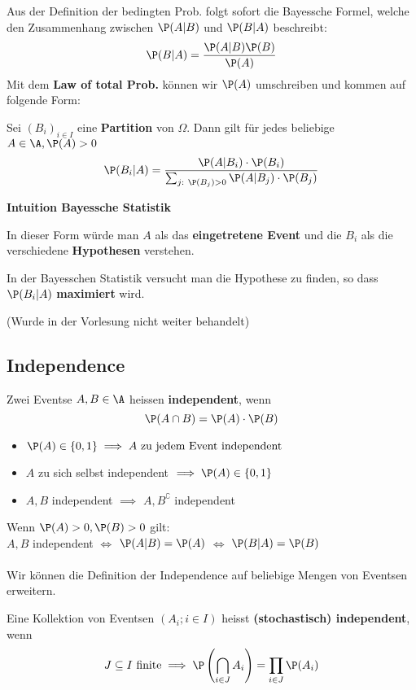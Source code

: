 Aus der Definition der bedingten Prob. folgt sofort die Bayessche Formel, welche den Zusammenhang zwischen $\P(A|B)$ und $\P(B|A)$ beschreibt:
$$\P(B|A) = \frac{\P(A|B)\P(B)}{\P(A)}$$
Mit dem \textbf{Law of total Prob.} können wir $\P(A)$ umschreiben und kommen auf folgende Form:

Sei $(B_i)_{i\in I}$ eine \textbf{Partition} von $\Omega$. Dann gilt für jedes beliebige $A \in \A, \P(A) > 0$
$$\P(B_i|A) = \frac{\P(A|B_i)\cdot\P(B_i)}{\sum_{j:\ \P(B_j)>0}\P(A|B_j)\cdot \P(B_j)}$$

\textbf{Intuition Bayessche Statistik}

In dieser Form würde man $A$ als das \textbf{eingetretene Event} und die $B_i$ als die verschiedene \textbf{Hypothesen} verstehen. 

In der Bayesschen Statistik versucht man die Hypothese zu finden, so dass $\P(B_i|A)$ \textbf{maximiert} wird.

(Wurde in der Vorlesung nicht weiter behandelt)
\subsection{Independence} 
\begin{mainbox}{}
    Zwei Eventse $A, B \in \A$ heissen \textbf{independent}, wenn 
    $$\P(A\cap B) = \P(A) \cdot \P(B)$$
\end{mainbox}
\begin{itemize}
    \item $\P(A) \in \{0, 1\} \implies A \text{ zu jedem Event independent}$
    \item $A$ zu sich selbst independent $\implies \P(A) \in \{0,1\}$
    \item $A, B$ independent $\implies$ $A, B^\complement$ independent
\end{itemize}
Wenn $\P(A) > 0, \P(B) > 0$ gilt:\\
 $A,B$ independent $\iff$ $\P(A|B)=\P(A)$ $\iff$ $\P(B|A)=\P(B)$
\\
\\
Wir können die Definition der Independence auf beliebige Mengen von Eventsen erweitern.
\begin{mainbox}{}
    Eine Kollektion von Eventsen $(A_i; i \in I)$ heisst \textbf{(stochastisch) independent}, wenn 
    $$J \subseteq I \text{ finite} \implies \P\left(\bigcap_{i\in J} A_i\right) = \prod_{i \in J} \P(A_i)$$
\end{mainbox}

